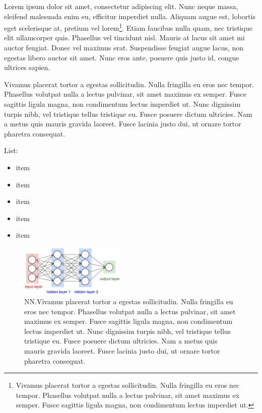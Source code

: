 Lorem ipsum dolor sit amet, consectetur adipiscing elit. Nunc neque massa, eleifend malesuada enim eu, efficitur imperdiet nulla. Aliquam augue est, lobortis eget scelerisque at, pretium vel lorem\footnote[2]{Vivamus placerat tortor a egestas sollicitudin. Nulla fringilla eu eros nec tempor. Phasellus volutpat nulla a lectus pulvinar, sit amet maximus ex semper. Fusce sagittis ligula magna, non condimentum lectus imperdiet ut.}. Etiam faucibus nulla quam, nec tristique elit ullamcorper quis. Phasellus vel tincidunt nisl. Mauris at lacus sit amet mi auctor feugiat. Donec vel maximus erat. Suspendisse feugiat augue lacus, non egestas libero auctor sit amet. Nunc eros ante, posuere quis justo id, congue ultrices sapien.

Vivamus placerat tortor a egestas sollicitudin. Nulla fringilla eu eros nec tempor. Phasellus volutpat nulla a lectus pulvinar, sit amet maximus ex semper. Fusce sagittis ligula magna, non condimentum lectus imperdiet ut. Nunc dignissim turpis nibh, vel tristique tellus tristique eu. Fusce posuere dictum ultricies. Nam a metus quis mauris gravida laoreet. Fusce lacinia justo dui, ut ornare tortor pharetra consequat.

List:
\begin{itemize}
    \setlength{\itemsep}{2pt}
    \item item
    \item item
    \item item
    \item item
    \item item
\end{itemize}



\begin{figure}[ht!]
\centering
\includegraphics[width=0.45\textwidth]{media/literature/NN.jpeg}
\caption[Example of a Neural Network]{\Gls{NN}.Vivamus placerat tortor a egestas sollicitudin. Nulla fringilla eu eros nec tempor. Phasellus volutpat nulla a lectus pulvinar, sit amet maximus ex semper. Fusce sagittis ligula magna, non condimentum lectus imperdiet ut. Nunc dignissim turpis nibh, vel tristique tellus tristique eu. Fusce posuere dictum ultricies. Nam a metus quis mauris gravida laoreet. Fusce lacinia justo dui, ut ornare tortor pharetra consequat.
}
\label{fig:NN}
\end{figure}




